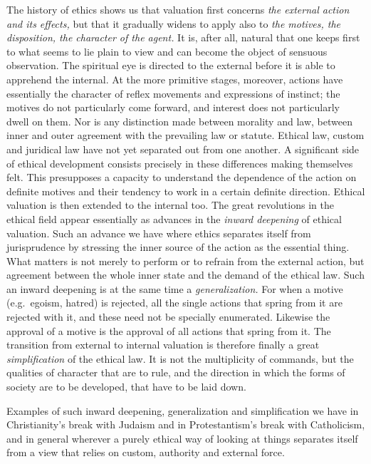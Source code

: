 \documentclass[12pt,a4paper,openany]{book}
\newcommand{\opage}[1]{\marginnote{\footnotesize\textit{[#1]}}}
\begin{document}
The history of ethics shows us that valuation first concerns \textit{the external action and its
effects,} but that it gradually widens to apply also to \textit{the motives, the disposition, the
character of the agent.} It is, after all, natural that one keeps first to what seems to lie plain
to view and can become
\opage{61}the object of sensuous observation. The spiritual eye is directed to the external before it is able
to apprehend the internal. At the more primitive stages, moreover, actions have essentially the
character of reflex movements and expressions of instinct; the motives do not particularly come
forward, and interest does not particularly dwell on them. Nor is any distinction made between
morality and law, between inner and outer agreement with the prevailing law or statute. Ethical law,
custom and juridical law have not yet separated out from one another. A significant side of ethical
development consists precisely in these differences making themselves felt. This presupposes a
capacity to understand the dependence of the action on definite motives and their tendency to work in
a certain definite direction. Ethical valuation is then extended to the internal too. The great
revolutions in the ethical field appear essentially as advances in the \textit{inward deepening} of
ethical valuation. Such an advance we have where ethics separates itself from jurisprudence by
stressing the inner source of the action as the essential thing. What matters is not merely to perform
or to refrain from the external action, but agreement between the whole inner state and the demand of
the ethical law. Such an inward deepening is at the same time a \textit{generalization.} For when a
motive (e.g.\ egoism, hatred) is rejected, all the single actions that spring from it are rejected
with it, and these need not be specially enumerated. Likewise the approval of a motive is the approval
of all actions that spring from it. The transition from external to internal valuation is therefore
finally a great \textit{simplification} of the ethical law. It is not the multiplicity of commands,
but the qualities of character that are to rule, and the direction in which the forms of society are
to be developed, that have to be laid down.

Examples of such inward deepening, generalization and simplification we have in Christianity's
break with Judaism and in Protestantism's break with Catholicism, and in general wherever a purely
ethical way of looking at things separates itself from a view that relies on custom, authority and
external force.
\end{document}
